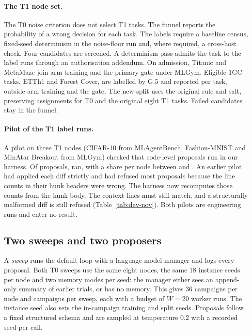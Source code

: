 \paragraph{The T1 node set.}
The T0 noise criterion does not select T1 tasks. The funnel reports the probability of a wrong decision for each task. The labels require a baseline census, fixed-seed determinism in the noise-floor run and, where required, a cross-host check. Four candidates are screened. A determinism pass admits the task to the label runs through an authorisation addendum. On admission, Titanic and MetaMaze join arm training and the primary gate under MLGym. Eligible 1GC tasks, ETTh1 and Forest Cover, are labelled by G.5 and reported per task, outside arm training and the gate. The new split uses the original rule and salt, preserving assignments for T0 and the original eight T1 tasks. Failed candidates stay in the funnel. 

\paragraph{Pilot of the T1 label runs.}
A pilot on three T1 nodes (CIFAR-10 from MLAgentBench, Fashion-MNIST and MinAtar Breakout from MLGym) checked that code-level proposals run in our harness. Of \PilotTOneProposals{} proposals, \PilotTOneRan{} ran, with a share per node between \PilotTOneLivenessMin{} and \PilotTOneLivenessMax. An earlier pilot had applied each diff strictly and had refused most proposals because the line counts in their hunk headers were wrong. The harness now recomputes those counts from the hunk body. The context lines must still match, and a structurally malformed diff is still refused (Table~\ref{tab:dev-nov}). Both pilots are engineering runs and enter no result.

\subsection{Two sweeps and two proposers}

A \emph{sweep} runs the default loop with a language-model manager and logs every proposal. Both T0 sweeps use the same eight nodes, the same 18 instance seeds per node and two memory modes per seed: the manager either sees an append-only summary of earlier trials, or has no memory. This gives 36 campaigns per node and \SweepTwoCampaigns{} campaigns per sweep, each with a budget of $W=20$ worker runs. The instance seed also sets the in-campaign training and split seeds. Proposals follow a fixed structured schema and are sampled at temperature 0.2 with a recorded seed per call.

